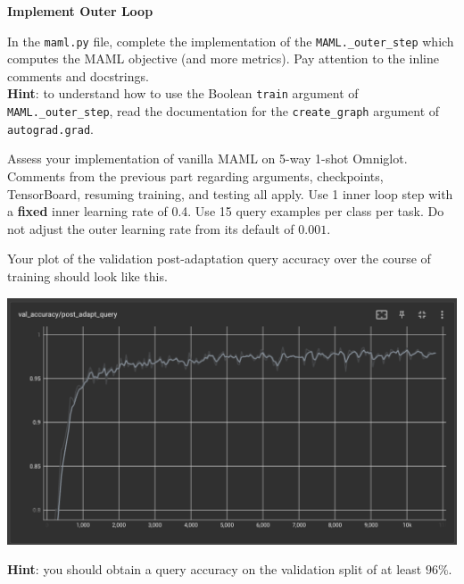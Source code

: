 \item {} {\bf Implement Outer Loop}

In the \texttt{maml.py} file, complete the implementation of the \texttt{MAML.\_outer\_step} which computes the MAML objective (and more metrics). Pay attention to the inline comments and docstrings. \\
\textbf{Hint}: to understand how to use the Boolean \texttt{train} argument of \texttt{MAML.\_outer\_step}, read the documentation for the \texttt{create\_graph} argument of \texttt{autograd.grad}.

Assess your implementation of vanilla MAML on 5-way 1-shot Omniglot. Comments from the previous part regarding arguments, checkpoints, TensorBoard, resuming training, and testing all apply. Use 1 inner loop step with a \textbf{fixed} inner learning rate of 0.4. Use 15 query examples per class per task. Do not adjust the outer learning rate from its default of $0.001$.

Your plot of the validation post-adaptation query accuracy over the course of training should look like this.
\begin{center}
    \includegraphics[width=0.75\linewidth]{./figures/maml_q1}
\end{center}

\textbf{Hint}: you should obtain a query accuracy on the validation split of at least $96\%$.

